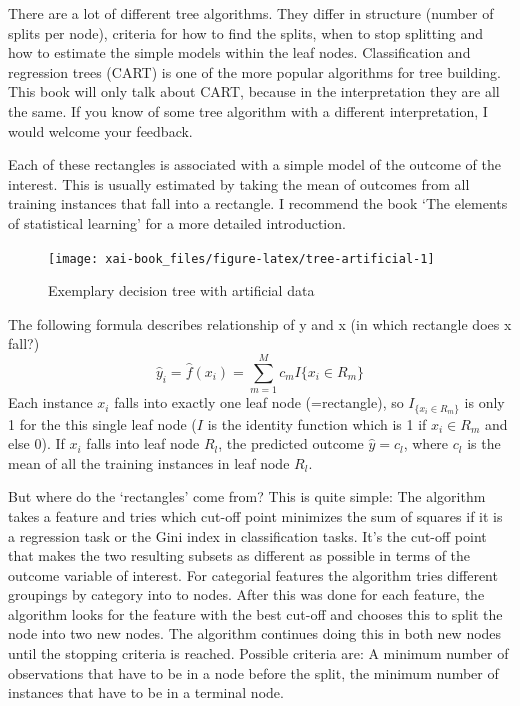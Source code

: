 \documentclass[12pt,]{krantz}
\theoremstyle{definition}
\theoremstyle{definition}
\theoremstyle{definition}
\theoremstyle{remark}
\begin{document}
There are a lot of different tree algorithms. They differ in structure
(number of splits per node), criteria for how to find the splits, when
to stop splitting and how to estimate the simple models within the leaf
nodes. Classification and regression trees (CART) is one of the more
popular algorithms for tree building. This book will only talk about
CART, because in the interpretation they are all the same. If you know
of some tree algorithm with a different interpretation, I would welcome
your feedback.

Each of these rectangles is associated with a simple model of the
outcome of the interest. This is usually estimated by taking the mean of
outcomes from all training instances that fall into a rectangle. I
recommend the book `The elements of statistical learning'
\citep{Hastie2009} for a more detailed introduction.

\begin{figure}
\texttt{[image: xai-book\_files/figure-latex/tree-artificial-1]} \caption{Exemplary decision tree with artificial data}\label{fig:tree-artificial}
\end{figure}

The following formula describes relationship of y and x (in which
rectangle does x fall?)
\[\hat{y}_i = \hat{f}(x_i) = \sum_{m = 1}^M c_m I\{x_i \in R_m\}\] Each
instance \(x_i\) falls into exactly one leaf node (=rectangle), so
\(I_{\{x_i \in R_m\}}\) is only 1 for the this single leaf node (\(I\)
is the identity function which is 1 if \(x_i \in R_m\) and else 0). If
\(x_i\) falls into leaf node \(R_l\), the predicted outcome
\(\hat{y} = c_l\), where \(c_l\) is the mean of all the training
instances in leaf node \(R_l\).

But where do the `rectangles' come from? This is quite simple: The
algorithm takes a feature and tries which cut-off point minimizes the
sum of squares if it is a regression task or the Gini index in
classification tasks. It's the cut-off point that makes the two
resulting subsets as different as possible in terms of the outcome
variable of interest. For categorial features the algorithm tries
different groupings by category into to nodes. After this was done for
each feature, the algorithm looks for the feature with the best cut-off
and chooses this to split the node into two new nodes. The algorithm
continues doing this in both new nodes until the stopping criteria is
reached. Possible criteria are: A minimum number of observations that
have to be in a node before the split, the minimum number of instances
that have to be in a terminal node.
\end{document}
